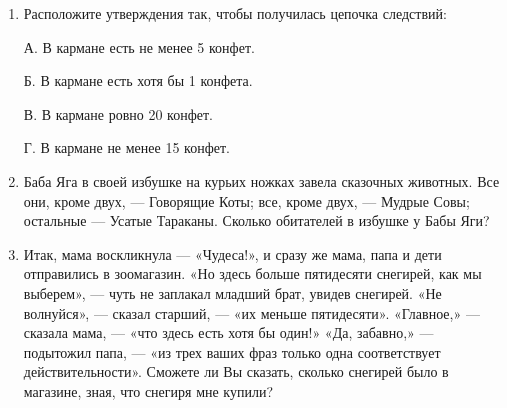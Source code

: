 \begin{enumerate}
    \vspace{0.5em}
    2. Среди любых пяти яблок в ящике найдётся хотя бы одно червивое.
    \begin{enumerate}
        \item В ящике червивых яблок больше, чем хороших.
        \item В ящике не может быть больше четырёх хороших яблок.
        \item В ящике лежит ровно четыре хороших яблока.
        \item В ящике есть хотя бы пять червивых яблок.
    \end{enumerate}
    \vspace{0.8em}


    \item Расположите утверждения так, чтобы получилась цепочка следствий:

    А. В кармане есть не менее 5 конфет.

    Б. В кармане есть хотя бы 1 конфета.
    
    В. В кармане ровно 20 конфет.

    Г. В кармане не менее 15 конфет.


\item Баба Яга в своей избушке на курьих ножках завела сказочных животных. Все они, кроме двух, — Говорящие Коты; все, кроме двух, — Мудрые Совы; остальные — Усатые Тараканы. Сколько обитателей в избушке у Бабы Яги?

\item Итак, мама воскликнула — «Чудеса!», и сразу же мама, папа и дети отправились в зоомагазин. «Но здесь больше пятидесяти снегирей, как мы выберем», — чуть не заплакал младший брат, увидев снегирей. «Не волнуйся», — сказал старший, — «их меньше пятидесяти». «Главное,» — сказала мама, — «что здесь есть хотя бы один!» «Да, забавно,» — подытожил папа, — «из трех ваших фраз только одна соответствует действительности». Сможете ли Вы сказать, сколько снегирей было в магазине, зная, что снегиря мне купили?
\end{enumerate}

